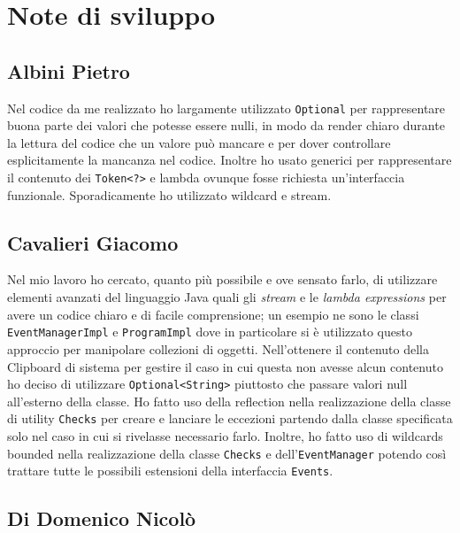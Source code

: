\section{Note di sviluppo}

\subsection{Albini Pietro}

Nel codice da me realizzato ho largamente utilizzato \texttt{Optional} per
rappresentare buona parte dei valori che potesse essere nulli, in modo da
render chiaro durante la lettura del codice che un valore può mancare e per
dover controllare esplicitamente la mancanza nel codice. Inoltre ho usato
generici per rappresentare il contenuto dei
\texttt{Token\textless{}?\textgreater{}} e lambda ovunque fosse richiesta
un'interfaccia funzionale.  Sporadicamente ho utilizzato wildcard e stream.

\subsection{Cavalieri Giacomo}

Nel mio lavoro ho cercato, quanto più possibile e ove sensato farlo, di
utilizzare elementi avanzati del linguaggio Java quali gli \emph{stream} e le
\emph{lambda expressions} per avere un codice chiaro e di facile comprensione;
un esempio ne sono le classi \texttt{EventManagerImpl} e \texttt{ProgramImpl}
dove in particolare si è utilizzato questo approccio per manipolare collezioni
di oggetti. Nell'ottenere il contenuto della Clipboard di sistema per gestire
il caso in cui questa non avesse alcun contenuto ho deciso di utilizzare
\texttt{Optional\textless{}String\textgreater{}} piuttosto che passare valori
null all'esterno della classe. Ho fatto uso della reflection nella
realizzazione della classe di utility \texttt{Checks} per creare e lanciare le
eccezioni partendo dalla classe specificata solo nel caso in cui si rivelasse
necessario farlo. Inoltre, ho fatto uso di wildcards bounded nella
realizzazione della classe \texttt{Checks} e dell'\texttt{EventManager} potendo
così trattare tutte le possibili estensioni della interfaccia \texttt{Events}.

\subsection{Di Domenico Nicolò}

